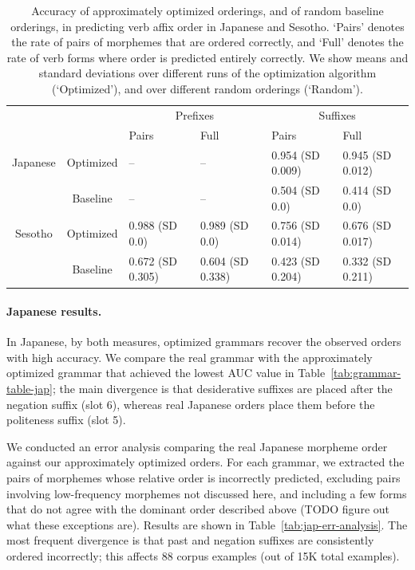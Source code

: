 \begin{table}
\begin{tabular}{cc||ll|ll}
             &              & \multicolumn{2}{c}{Prefixes}    & \multicolumn{2}{|c}{Suffixes} \\
             &              & Pairs & Full & Pairs & Full \\ \hline\hline
Japanese & Optimized  & -- &  -- &   0.954 (SD 0.009) & 0.945 (SD 0.012) \\ 
& Baseline    & -- & -- & 0.504 (SD 0.0) & 0.414 (SD 0.0) \\ \hline
Sesotho &   Optimized  &  0.988 (SD 0.0) & 0.989 (SD 0.0) & 0.756 (SD 0.014) & 0.676 (SD 0.017) \\
&   Baseline  &  0.672 (SD 0.305) & 0.604 (SD 0.338) & 0.423 (SD 0.204) & 0.332 (SD 0.211) \\ 
\end{tabular}
\caption{Accuracy of approximately optimized orderings, and of random baseline orderings, in predicting verb affix order in Japanese and Sesotho. `Pairs' denotes the rate of pairs of morphemes that are ordered correctly, and `Full' denotes the rate of verb forms where order is predicted entirely correctly. We show means and standard deviations over different runs of the optimization algorithm (`Optimized'), and over different random orderings (`Random').}\label{tab:morph-acc}
\end{table}

\paragraph{Japanese results.} In Japanese, by both measures, optimized grammars recover the observed orders with high accuracy.
We compare the real grammar with the approximately optimized grammar that achieved the lowest AUC value in Table~\ref{tab:grammar-table-jap}; the main divergence is that desiderative suffixes are placed after the negation suffix (slot 6), whereas real Japanese orders place them before the politeness suffix (slot 5).

We conducted an error analysis comparing the real Japanese morpheme order against our approximately optimized orders.
For each grammar, we extracted the pairs of morphemes whose relative order is incorrectly predicted, excluding pairs involving low-frequency morphemes not discussed here, and including a few forms that do not agree with the dominant order described above (TODO figure out what these exceptions are).
Results are shown in Table~\ref{tab:jap-err-analysis}.
The most frequent divergence is that past and negation suffixes are consistently ordered incorrectly; this affects 88 corpus examples (out of 15K total examples).

